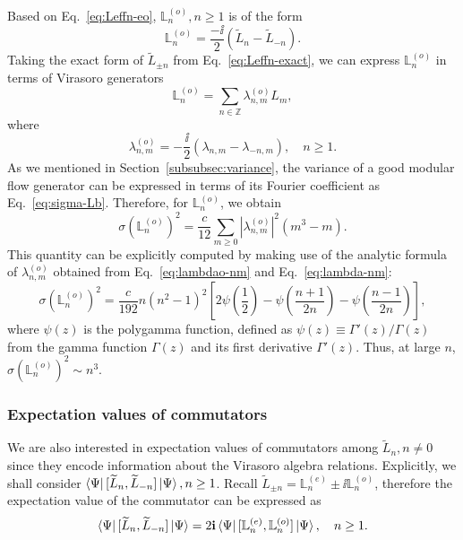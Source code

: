 \documentclass[12pt, nofootinbib]{article}
\theoremstyle{plain}
\theoremstyle{assumption}
\theoremstyle{definition}
\theoremstyle{plain}
\theoremstyle{plain}
\theoremstyle{plain}
\theoremstyle{plain}
\theoremstyle{plain}
\def\Lbe{\mathbb{L}^{(e)}}
\def\Lbo{\mathbb{L}^{(o)}}
\def\Leff{\widetilde{L}}
\begin{document}
Based on Eq.~\eqref{eq:Leffn-eo}, $\Lbo_n,n\geq 1$ is of the form 
\begin{equation}
    \Lbo_n = \frac{-\ii }{2} (\Leff_n - \Leff_{-n}).
\end{equation}
Taking the exact form of $\Leff_{\pm n}$ from Eq.~\eqref{eq:Leffn-exact}, we can express $\Lbo_n$ in terms of Virasoro generators 
\begin{equation}
    \Lbo_n = \sum_{n\in\mathbb{Z}} \lambda^{(o)}_{n,m} L_m,
\end{equation}
where 
\begin{equation}\label{eq:lambdao-nm}
     \lambda^{(o)}_{n,m} = -\frac{\ii }{2}(\lambda_{n,m}-\lambda_{-n,m}),\quad n\geq 1. 
\end{equation}
As we mentioned in Section~\ref{subsubsec:variance}, the variance of a good modular flow generator can be expressed in terms of its Fourier coefficient as Eq.~\eqref{eq:sigma-Lb}. Therefore, for $\Lbo_n$, we obtain 
\begin{equation}
    \sigma(\Lbo_n)^2 = \frac{c}{12}\sum_{m\geq 0} |\lambda^{(o)}_{n,m}|^2 (m^3-m). 
\end{equation}
This quantity can be explicitly computed by making use of the analytic formula of $\lambda^{(o)}_{n,m}$ obtained from Eq.~\eqref{eq:lambdao-nm} and Eq.~\eqref{eq:lambda-nm}:
\begin{equation}\label{eq:sigma-Lb-analytic}
    \sigma(\Lbo_n)^2 = \frac{c}{192}n(n^2-1)^2 \left[ 2\psi\left( \frac{1}{2} \right)- \psi\left( \frac{n+1}{2n} \right)-\psi\left( \frac{n-1}{2n} \right)\right],
\end{equation}
where $\psi(z)$ is the polygamma function, defined as $\psi(z)\equiv \Gamma'(z)/\Gamma(z)$ from the gamma function $\Gamma(z)$ and its first derivative $\Gamma'(z)$. Thus, at large $n$, $\sigma(\Lbo_n)^2 \sim n^3$.  

\subsubsection{Expectation values of commutators}
\label{subsubsec:expt-comm}
We are also interested in expectation values of commutators among $\Leff_{n},n\neq 0$ since they encode information about the Virasoro algebra relations.  Explicitly, we shall consider $\bra{\Psi}[\Leff_n,\Leff_{-n}]\ket{\Psi},n\geq 1$. Recall $\Leff_{\pm n} = \Lbe_n \pm \ii \Lbo_n$, therefore the expectation value of the commutator can be expressed as 
\begin{equation}
    \bra{\Psi}[\Leff_n,\Leff_{-n}]\ket{\Psi} = 2\ii \bra{\Psi}[\Lbe_n,\Lbo_{n}]\ket{\Psi},\quad n\geq 1. 
\end{equation}
\end{document}
